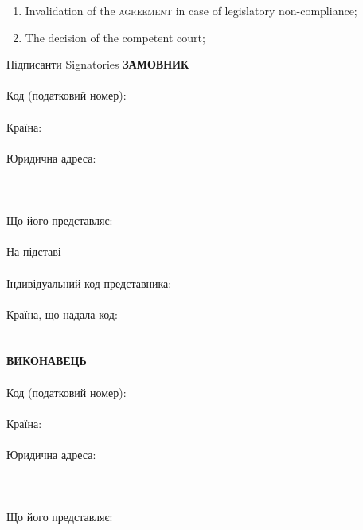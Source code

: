 \begin{Form}
\begin{paracol}{3}
{\begin{enumerate}
          \item Invalidation of the \textsc{agreement} in case of legislatory non-compliance;
          \item The decision of the competent court; 
        \end{enumerate} }
        {}
      \clausenewpage
        {Підписанти}
        {Signatories}
        {}
        {\textbf{ЗАМОВНИК}\\
        \\
        Код (податковий номер):\\
        \\
        Країна:\\
        \\
        Юридична адреса:\\
        \\
        \\
        \\
        Що його представляє:\\
        \\
        На підставі\\
        \\
        Індивідуальний код представника:\\
        \\
        Країна, що надала код:\\
        \\
        \\
        \textbf{ВИКОНАВЕЦЬ}\\
        \\
        Код (податковий номер):\\
        \\
        Країна:\\
        \\
        Юридична адреса:\\
        \\
        \\
        \\
        Що його представляє:\\
        \\
}
\end{paracol}
\end{Form}
